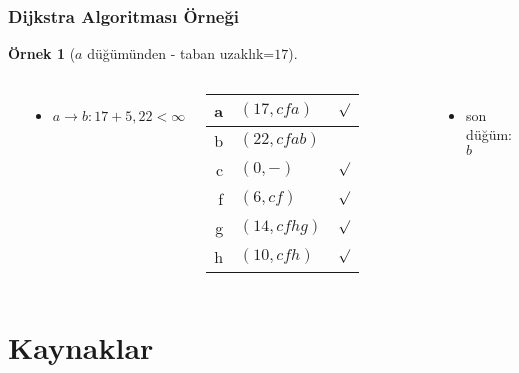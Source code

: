 \documentclass[dvipsnames]{beamer}
\theoremstyle{definition}
\theoremstyle{example}
\newtheorem{ornek}[theorem]{Örnek}
\theoremstyle{plain}
\begin{document}
\begin{frame}
  \frametitle{Dijkstra Algoritması Örneği}

  \begin{ornek}[$a$ düğümünden - taban uzaklık=$17$]
    \begin{columns}
      \begin{center}
      \end{center}

      \begin{itemize}
        \item $a \rightarrow b: 17+5, 22 < \infty$
      \end{itemize}

      \pause
      \begin{table}
        \begin{tabular}{r|l|c}
          a & $(17,cfa)$   & $\surd$ \\\hline
          b & $(22,cfab)$  & \\\hline
          c & $(0,-)$      & $\surd$ \\\hline
          f & $(6,cf)$     & $\surd$ \\\hline
          g & $(14,cfhg)$  & $\surd$ \\\hline
          h & $(10,cfh)$   & $\surd$
        \end{tabular}
      \end{table}

      \pause
      \begin{itemize}
        \item son düğüm: $b$
      \end{itemize}
    \end{columns}
  \end{ornek}
\end{frame}

\section*{Kaynaklar}
\end{document}
